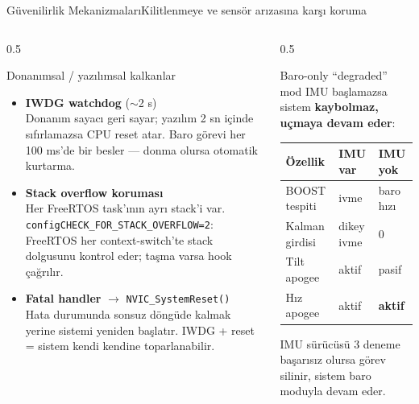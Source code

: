 \begin{frame}{Güvenilirlik Mekanizmaları}{Kilitlenmeye ve sensör arızasına karşı koruma}
  \begin{columns}[T]
    \begin{column}{0.5\textwidth}
      \begin{block}{Donanımsal / yazılımsal kalkanlar}
        \scriptsize
        \begin{itemize}\setlength{\itemsep}{3pt}
          \item \textbf{IWDG watchdog} ($\sim$2 s)\\
            \tiny Donanım sayacı geri sayar; yazılım 2 sn içinde sıfırlamazsa CPU reset atar.
            Baro görevi her 100 ms'de bir besler — donma olursa otomatik kurtarma.
          \item \textbf{Stack overflow koruması}\\
            \tiny Her FreeRTOS task'ının ayrı stack'i var. \texttt{configCHECK\_FOR\_STACK\_OVERFLOW=2}:
            FreeRTOS her context-switch'te stack dolgusunu kontrol eder; taşma varsa hook çağrılır.
          \item \textbf{Fatal handler} $\rightarrow$ \texttt{NVIC\_SystemReset()}\\
            \tiny Hata durumunda sonsuz döngüde kalmak yerine sistemi yeniden başlatır.
            IWDG + reset = sistem kendi kendine toparlanabilir.
        \end{itemize}
      \end{block}
    \end{column}
    \begin{column}{0.5\textwidth}
      \begin{exampleblock}{Baro-only ``degraded'' mod}
        \footnotesize IMU başlamazsa sistem \textbf{kaybolmaz, uçmaya devam eder}:
        \scriptsize
        \begin{tabular}{@{}lll@{}}
          \toprule
          \textbf{Özellik} & \textbf{IMU var} & \textbf{IMU yok} \\
          \midrule
          BOOST tespiti & ivme & baro hızı \\
          Kalman girdisi & dikey ivme & 0 \\
          Tilt apogee & aktif & pasif \\
          Hız apogee & aktif & \textbf{aktif} \\
          \bottomrule
        \end{tabular}
      \end{exampleblock}
      \centering\scriptsize
      IMU sürücüsü 3 deneme başarısız olursa görev silinir, sistem baro moduyla devam eder.
    \end{column}
  \end{columns}
\end{frame}

